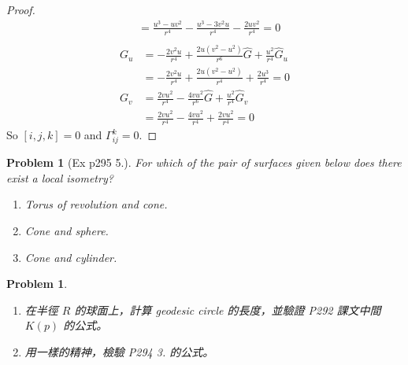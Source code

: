 \documentclass[10pt,a4paper]{article}
\newcounter{theProblemCounter}
\newtheorem{problem}[theProblemCounter]{Problem}
\begin{document}
\begin{proof}
\begin{align*}
&=\frac{u^3-uv^2}{r^4}-\frac{u^3-3v^2u}{r^4}-\frac{2uv^2}{r^4}=0\\
\end{align*}
\begin{align*}
G_u&=-\frac{2v^2u}{r^4}+\frac{2u(v^2-u^2)}{r^6}\hat{G}+\frac{u^2}{r^4}\hat{G}_u\\
&=-\frac{2v^2u}{r^4}+\frac{2u(v^2-u^2)}{r^4}+\frac{2u^3}{r^4}=0\\
G_v&=\frac{2vu^2}{r^4}-\frac{4vu^2}{r^6}\hat{G}+\frac{u^2}{r^4}\hat{G}_v\\
&=\frac{2vu^2}{r^4}-\frac{4vu^2}{r^4}+\frac{2vu^2}{r^4}=0
\end{align*}
So $[i,j,k]=0$ and $\Gamma_{ij}^k=0$.
\end{proof}

\setcounter{theProblemCounter}{4}
\begin{problem}[Ex p295 5.]
For which of the pair of surfaces given below does there exist a local isometry?
\begin{enumerate}
\item[(a)] Torus of revolution and cone.
\item[(b)] Cone and sphere.
\item[(c)] Cone and cylinder.
\end{enumerate}
\end{problem}

\setcounter{theProblemCounter}{7}
\begin{problem}\hspace*{1em}
\begin{enumerate}
\item[(a)] 在半徑 $R$ 的球面上，計算 geodesic circle 的長度，並驗證 P292 課文中間 $K(p)$ 的公式。
\item[(b)] 用一樣的精神，檢驗 P294 3. 的公式。
\end{enumerate}
\end{problem}
\end{document}
